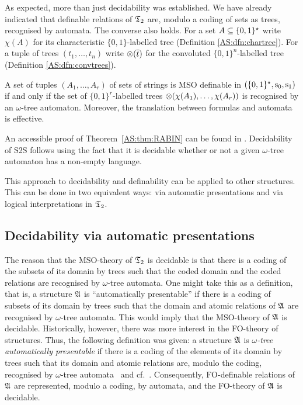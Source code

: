 As expected, more than just decidability was established. We have already indicated that definable relations of $\mathfrak{T}_2$ are, modulo a coding of sets as trees, recognised by automata. The converse also holds. For a set $A \subseteq \{0,1\}^\star$ write $\chi(A)$ for its characteristic $\{0,1\}$-labelled tree (Definition \ref{AS:dfn:chartree}). For a tuple of trees $(t_1,\dots,t_n)$ write $\otimes(\mbox{$\overline {t}$})$
for the convoluted $\{0,1\}^n$-labelled tree (Definition \ref{AS:dfn:convtrees}).  

\begin{theorem} \label{AS:thm:RABIN}
A set of tuples $(A_1,\dots,A_r)$ of sets of strings is MSO definable in $\mbox{$(\{0,1\}^{\star},\mathrm{s}_0, \mathrm{s}_1)$}$ if and only if the set of $\{0,1\}^r$-labelled trees 
$\otimes(\chi(A_1),\dots,\chi(A_r))$ is recognised by an $\omega$-tree automaton. Moreover, the translation between formulas and automata is effective.
\end{theorem}


An accessible proof of Theorem~\ref{AS:thm:RABIN} can be found in \cite{Thom90}. Decidability of S2S follows using the fact that it is decidable whether or not a given $\omega$-tree automaton has a non-empty language. 

This approach to decidability and definability can be applied to other structures. This can be done in two equivalent ways: via automatic presentations and via logical interpretations in $\mathfrak{T}_2$.


\subsection{Decidability via automatic presentations}

The reason that the MSO-theory of $\mathfrak{T}_2$ is decidable is that there is a coding of the {subsets of its domain} by trees such that the coded domain and the coded relations are recognised by $\omega$-tree automata. One might take this as a definition, that is, a structure $\mathfrak{A}$ is ``automatically presentable'' if there is a coding of subsets of its domain by trees such that the domain and atomic relations of $\mathfrak{A}$ are recognised by $\omega$-tree automata. This would imply that the MSO-theory of $\mathfrak{A}$ is decidable. Historically, however, there was more interest in the FO-theory of structures. Thus, the following definition was given: a structure $\mathfrak{A}$ is \emph{$\omega$-tree automatically presentable} if there is a coding of the {elements of its domain} by trees such that its domain and atomic relations are, modulo the coding, recognised by $\omega$-tree automata~\cite{BLGr00} and cf.~\cite{KhNe95,Hodg76}. Consequently, FO-definable relations of $\mathfrak{A}$ are represented, modulo a coding, by automata, and the FO-theory of $\mathfrak{A}$ is decidable. 

